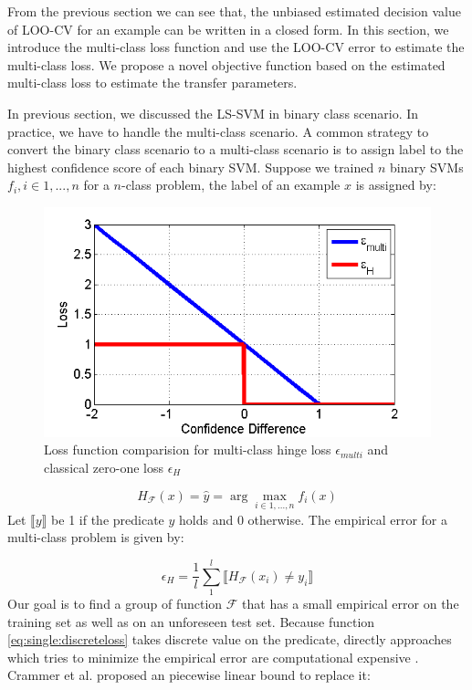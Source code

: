 From the previous section we can see that, the unbiased estimated decision value of LOO-CV for an example can be written in a closed form. In this section, we introduce the multi-class loss function and use the LOO-CV error to estimate the multi-class loss. We propose a novel objective function based on the estimated multi-class loss to estimate the transfer parameters.

In previous section, we discussed the LS-SVM in binary class scenario. In practice, we have to handle the multi-class scenario. A common strategy to convert the binary class scenario to a multi-class scenario is to assign label to the highest confidence score of each binary SVM. Suppose we trained $n$ binary SVMs $f_i,i\in 1,...,n$ for a $n$-class problem, the label of an example $x$ is assigned by:
\begin{figure}
	\centering
	\includegraphics[scale=.7]{transfer/fig/losscmp.png}
	\caption{Loss function comparision for multi-class hinge loss $\epsilon_{multi}$ and classical zero-one loss  $\epsilon_{H}$}\label{fig:single:losscmp}
\end{figure}
\begin{equation}
H_{\mathcal{F}}(x)=\hat{y}=\arg \underset{i \in 1,...,n}{\max}f_i(x)
\end{equation} 
Let $\llbracket y\rrbracket$ be 1 if the predicate $y$ holds and 0 otherwise. The empirical error for a multi-class problem is given by:

\begin{equation} \label{eq:single:discreteloss}
	\epsilon_{H} = \frac{1}{l}\sum_{1}^{l}\llbracket H_{\mathcal{F}}(x_i) \neq y_i \rrbracket
\end{equation}
Our goal is to find a group of function $\mathcal{F}$ that has a small empirical error on the training set as well as on an unforeseen test set. Because function \eqref{eq:single:discreteloss} takes discrete value on the predicate, directly approaches which tries to minimize the empirical error are computational expensive \cite{crammer2002learnability}. Crammer et al. \cite{crammer2002algorithmic} proposed an piecewise linear bound to replace it:

